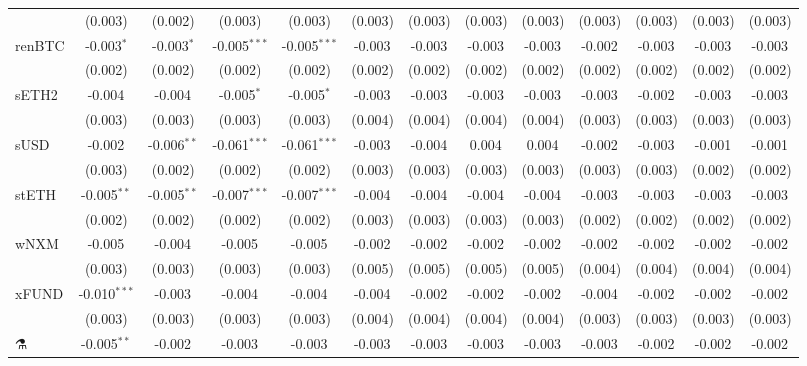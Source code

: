 \begin{table}[!htbp]
\begin{tabular}{@{\extracolsep{5pt}}lcccccccccccc}
  & (0.003) & (0.002) & (0.003) & (0.003) & (0.003) & (0.003) & (0.003) & (0.003) & (0.003) & (0.003) & (0.003) & (0.003) \\
 renBTC & -0.003$^{*}$ & -0.003$^{*}$ & -0.005$^{***}$ & -0.005$^{***}$ & -0.003$^{}$ & -0.003$^{}$ & -0.003$^{}$ & -0.003$^{}$ & -0.002$^{}$ & -0.003$^{}$ & -0.003$^{}$ & -0.003$^{}$ \\
  & (0.002) & (0.002) & (0.002) & (0.002) & (0.002) & (0.002) & (0.002) & (0.002) & (0.002) & (0.002) & (0.002) & (0.002) \\
 sETH2 & -0.004$^{}$ & -0.004$^{}$ & -0.005$^{*}$ & -0.005$^{*}$ & -0.003$^{}$ & -0.003$^{}$ & -0.003$^{}$ & -0.003$^{}$ & -0.003$^{}$ & -0.002$^{}$ & -0.003$^{}$ & -0.003$^{}$ \\
  & (0.003) & (0.003) & (0.003) & (0.003) & (0.004) & (0.004) & (0.004) & (0.004) & (0.003) & (0.003) & (0.003) & (0.003) \\
 sUSD & -0.002$^{}$ & -0.006$^{**}$ & -0.061$^{***}$ & -0.061$^{***}$ & -0.003$^{}$ & -0.004$^{}$ & 0.004$^{}$ & 0.004$^{}$ & -0.002$^{}$ & -0.003$^{}$ & -0.001$^{}$ & -0.001$^{}$ \\
  & (0.003) & (0.002) & (0.002) & (0.002) & (0.003) & (0.003) & (0.003) & (0.003) & (0.003) & (0.003) & (0.002) & (0.002) \\
 stETH & -0.005$^{**}$ & -0.005$^{**}$ & -0.007$^{***}$ & -0.007$^{***}$ & -0.004$^{}$ & -0.004$^{}$ & -0.004$^{}$ & -0.004$^{}$ & -0.003$^{}$ & -0.003$^{}$ & -0.003$^{}$ & -0.003$^{}$ \\
  & (0.002) & (0.002) & (0.002) & (0.002) & (0.003) & (0.003) & (0.003) & (0.003) & (0.002) & (0.002) & (0.002) & (0.002) \\
 wNXM & -0.005$^{}$ & -0.004$^{}$ & -0.005$^{}$ & -0.005$^{}$ & -0.002$^{}$ & -0.002$^{}$ & -0.002$^{}$ & -0.002$^{}$ & -0.002$^{}$ & -0.002$^{}$ & -0.002$^{}$ & -0.002$^{}$ \\
  & (0.003) & (0.003) & (0.003) & (0.003) & (0.005) & (0.005) & (0.005) & (0.005) & (0.004) & (0.004) & (0.004) & (0.004) \\
 xFUND & -0.010$^{***}$ & -0.003$^{}$ & -0.004$^{}$ & -0.004$^{}$ & -0.004$^{}$ & -0.002$^{}$ & -0.002$^{}$ & -0.002$^{}$ & -0.004$^{}$ & -0.002$^{}$ & -0.002$^{}$ & -0.002$^{}$ \\
  & (0.003) & (0.003) & (0.003) & (0.003) & (0.004) & (0.004) & (0.004) & (0.004) & (0.003) & (0.003) & (0.003) & (0.003) \\
 ⚗️ & -0.005$^{**}$ & -0.002$^{}$ & -0.003$^{}$ & -0.003$^{}$ & -0.003$^{}$ & -0.003$^{}$ & -0.003$^{}$ & -0.003$^{}$ & -0.003$^{}$ & -0.002$^{}$ & -0.002$^{}$ & -0.002$^{}$ \\

\end{tabular}
\end{table}
